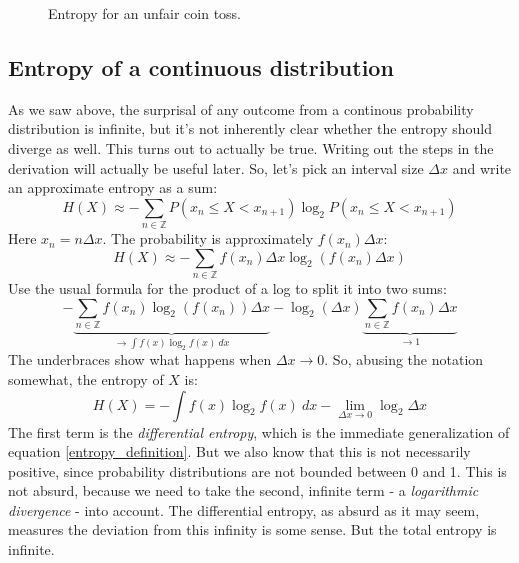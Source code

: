 \documentclass[12pt, a4paper]{article}
\numberwithin{equation}{section}
\begin{document}
\begin{figure}
\centering
{}
\caption{Entropy for an unfair coin toss.}
\label{fig:coin_entropy}
\end{figure}

\subsection{Entropy of a continuous distribution}
\label{continous_entropy}
As we saw above, the surprisal of any outcome from a continous probability distribution is infinite, but it's not inherently clear whether the entropy should diverge as well. This turns out to actually be true. Writing out the steps in the derivation will actually be useful later. So, let's pick an interval size $\Delta x$ and write an approximate entropy as a sum:
\begin{equation}
H(X)\approx -\sum_{n\in\mathbb{Z}}P(x_n\le X<x_{n+1})\log_2 P(x_n\le X<x_{n+1})
\end{equation}
Here $x_n=n\Delta x$. The probability is approximately $f(x_n)\Delta x$:
\begin{equation}
H(X)\approx -\sum_{n\in\mathbb{Z}}f(x_n)\Delta x\log_2(f(x_n)\Delta x)
\end{equation}
Use the usual formula for the product of a log to split it into two sums:
\begin{equation}
-\underbrace{\sum_{n\in\mathbb{Z}}f(x_n)\log_2(f(x_n))\Delta x}_{\rightarrow\int f(x)\log_2 f(x)\ dx}-\log_2(\Delta x)\underbrace{\sum_{n\in\mathbb{Z}}f(x_n)\Delta x}_{\rightarrow 1}
\end{equation}
The underbraces show what happens when $\Delta x\rightarrow 0$. So, abusing the notation somewhat, the entropy of $X$ is:
\begin{equation}
H(X)=-\int f(x)\log_2 f(x)\ dx-\lim_{\Delta x\rightarrow 0}\log_2\Delta x
\end{equation}
The first term is the \textit{differential entropy}, which is the immediate generalization of equation \ref{entropy_definition}. But we also know that this is not necessarily positive, since probability distributions are not bounded between 0 and 1. This is not absurd, because we need to take the second, infinite term - a \textit{logarithmic divergence} - into account. The differential entropy, as absurd as it may seem, measures the deviation from this infinity is some sense. But the total entropy is infinite.
\end{document}
